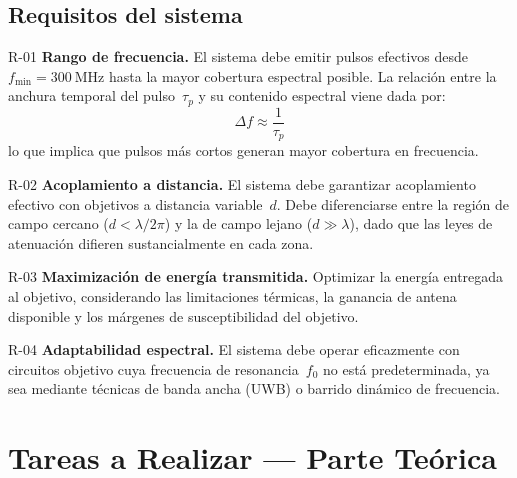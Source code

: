 \documentclass[11pt,a4paper]{article}
\begin{document}
\subsection{Requisitos del sistema}

\begin{requisitobox}{R-01}
\textbf{Rango de frecuencia.} El sistema debe emitir pulsos efectivos desde
$f_{\min} = \SI{300}{\mega\hertz}$ hasta la mayor cobertura espectral posible.
La relación entre la anchura temporal del pulso~$\tau_p$ y su contenido espectral viene dada por:
\[
  \Delta f \approx \frac{1}{\tau_p}
\]
lo que implica que pulsos más cortos generan mayor cobertura en frecuencia.
\end{requisitobox}

\vspace{6pt}

\begin{requisitobox}{R-02}
\textbf{Acoplamiento a distancia.} El sistema debe garantizar acoplamiento efectivo
con objetivos a distancia variable~$d$. Debe diferenciarse entre la región de campo
cercano ($d < \lambda/2\pi$) y la de campo lejano ($d \gg \lambda$), dado que las
leyes de atenuación difieren sustancialmente en cada zona.
\end{requisitobox}

\vspace{6pt}

\begin{requisitobox}{R-03}
\textbf{Maximización de energía transmitida.} Optimizar la energía entregada al
objetivo, considerando las limitaciones térmicas, la ganancia de antena disponible
y los márgenes de susceptibilidad del objetivo.
\end{requisitobox}

\vspace{6pt}

\begin{requisitobox}{R-04}
\textbf{Adaptabilidad espectral.} El sistema debe operar eficazmente con circuitos
objetivo cuya frecuencia de resonancia~$f_0$ no está predeterminada, ya sea mediante
técnicas de banda ancha (UWB) o barrido dinámico de frecuencia.
\end{requisitobox}

\section{Tareas a Realizar --- Parte Teórica}
\end{document}
